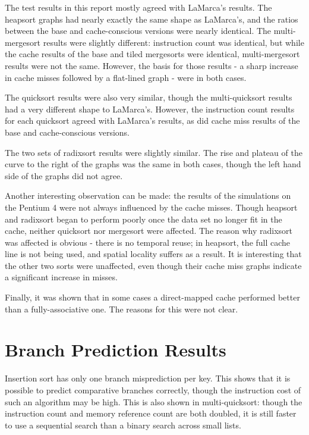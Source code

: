 The test results in this report mostly agreed with LaMarca's results.  The
heapsort graphs had nearly exactly the same shape as LaMarca's, and the ratios
between the base and cache-conscious versions were nearly identical. The
multi-mergesort results were slightly different: instruction count was
identical, but while the cache results of the base and tiled mergesorts were
identical, multi-mergesort results were not the same. However, the basis for
those results - a sharp increase in cache misses followed by a flat-lined graph
- were in both cases.

The quicksort results were also very similar, though the multi-quicksort results
had a very different shape to LaMarca's. However, the instruction count
results for each quicksort agreed with LaMarca's results, as did cache miss
results of the base and cache-conscious versions.

The two sets of radixsort results were slightly similar. The rise and plateau of
the curve to the right of the graphs was the same in both cases, though the left
hand side of the graphs did not agree.

Another interesting observation can be made: the results of the simulations on
the Pentium 4 were not always influenced by the cache misses. Though heapsort
and radixsort began to perform poorly once the data set no longer fit in the
cache, neither quicksort nor mergesort were affected. The reason why radixsort
was affected is obvious - there is no temporal reuse; in heapsort, the full
cache line is not being used, and spatial locality suffers as a result. It is
interesting that the other two sorts were unaffected, even though their cache
miss graphs indicate a significant increase in misses.

Finally, it was shown that in some cases a direct-mapped cache performed better
than a fully-associative one. The reasons for this were not clear.

\section{Branch Prediction Results}

Insertion sort has only one branch misprediction per key. This shows that it is
possible to predict comparative branches correctly, though the instruction cost
of such an algorithm may be high. This is also shown in multi-quicksort: though
the instruction count and memory reference count are both doubled, it is still
faster to use a sequential search than a binary search across small lists.


